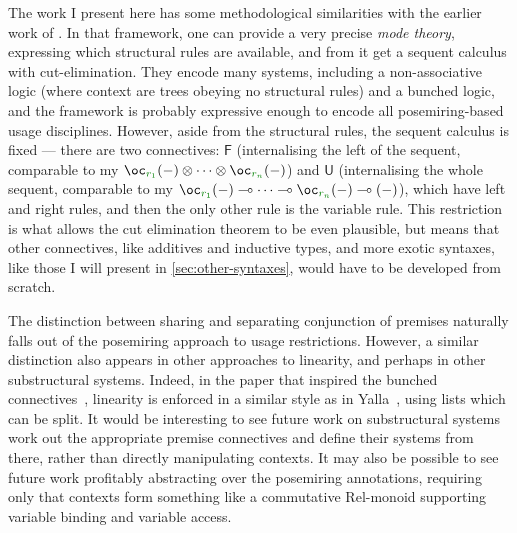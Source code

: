 The work I present here has some methodological similarities with the earlier
work of \citet{LicataSR17}.
In that framework, one can provide a very precise \emph{mode theory}, expressing
which structural rules are available, and from it get a sequent calculus with
cut-elimination.
They encode many systems, including a non-associative logic (where context are
trees obeying no structural rules) and a bunched logic, and the framework is
probably expressive enough to encode all posemiring-based usage disciplines.
However, aside from the structural rules, the sequent calculus is fixed ---
there are two connectives: $\mathsf F$ (internalising the left of the sequent,
comparable to my
$\oc_{\gr{r_1}}\plr{-} \otimes \cdots \otimes \oc_{\gr{r_n}}\plr{-}$) and
$\mathsf U$ (internalising the whole sequent, comparable to my
$\oc_{\gr{r_1}}\plr{-} \multimap \cdots \multimap \oc_{\gr{r_n}}\plr{-}
\multimap \plr{-}$), which have left and right rules, and then the only other
rule is the variable rule.
This restriction is what allows the cut elimination theorem to be even
plausible, but means that other connectives, like additives and inductive types,
and more exotic syntaxes, like those I will present in
\cref{sec:other-syntaxes}, would have to be developed from scratch.

The distinction between sharing and separating conjunction of premises naturally
falls out of the posemiring approach to usage restrictions.
However, a similar distinction also appears in other approaches to linearity,
and perhaps in other substructural systems.
Indeed, in the paper that inspired the bunched connectives~\citep{RPKV20},
linearity is enforced in a similar style as in Yalla~\citep{laurent18}, using
lists which can be split.
It would be interesting to see future work on substructural systems work out the
appropriate premise connectives and define their systems from there, rather than
directly manipulating contexts.
It may also be possible to see future work profitably abstracting over the
posemiring annotations, requiring only that contexts form something like a
commutative $\mathrm{Rel}$-monoid supporting variable binding and
variable access.
